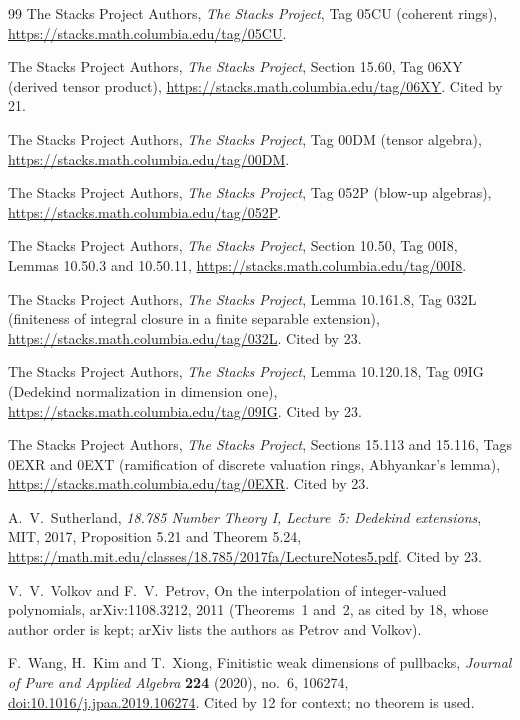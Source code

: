 \documentclass[11pt,letterpaper]{article}
\numberwithin{equation}{section}
\theoremstyle{definition}
\theoremstyle{remark}
\theoremstyle{plain}
\begin{document}
\begin{thebibliography}{99}
The Stacks Project Authors, \emph{The Stacks Project}, Tag 05CU (coherent rings),
\url{https://stacks.math.columbia.edu/tag/05CU}.

The Stacks Project Authors, \emph{The Stacks Project}, Section 15.60, Tag 06XY (derived tensor product),
\url{https://stacks.math.columbia.edu/tag/06XY}. Cited by 21.

The Stacks Project Authors, \emph{The Stacks Project}, Tag 00DM (tensor algebra),
\url{https://stacks.math.columbia.edu/tag/00DM}.

The Stacks Project Authors, \emph{The Stacks Project}, Tag 052P (blow-up algebras),
\url{https://stacks.math.columbia.edu/tag/052P}.

The Stacks Project Authors, \emph{The Stacks Project}, Section 10.50, Tag 00I8, Lemmas 10.50.3 and
10.50.11, \url{https://stacks.math.columbia.edu/tag/00I8}.

The Stacks Project Authors, \emph{The Stacks Project}, Lemma 10.161.8, Tag 032L (finiteness of integral closure in a finite separable extension),
\url{https://stacks.math.columbia.edu/tag/032L}. Cited by 23.

The Stacks Project Authors, \emph{The Stacks Project}, Lemma 10.120.18, Tag 09IG (Dedekind normalization in dimension one),
\url{https://stacks.math.columbia.edu/tag/09IG}. Cited by 23.

The Stacks Project Authors, \emph{The Stacks Project}, Sections 15.113 and 15.116, Tags 0EXR and 0EXT (ramification of discrete valuation rings,
Abhyankar's lemma), \url{https://stacks.math.columbia.edu/tag/0EXR}. Cited by 23.

A.~V.~Sutherland, \emph{18.785 Number Theory I, Lecture~5: Dedekind extensions}, MIT, 2017, Proposition 5.21 and Theorem 5.24,
\url{https://math.mit.edu/classes/18.785/2017fa/LectureNotes5.pdf}. Cited by 23.

V.~V.~Volkov and F.~V.~Petrov, On the interpolation of integer-valued polynomials, arXiv:1108.3212, 2011 (Theorems~1 and~2, as
cited by 18, whose author order is kept; arXiv lists the authors as Petrov and Volkov).

F.~Wang, H.~Kim and T.~Xiong, Finitistic weak dimensions of pullbacks, \emph{Journal of Pure and Applied
Algebra} \textbf{224} (2020), no.~6, 106274,
\href{https://doi.org/10.1016/j.jpaa.2019.106274}{doi:10.1016/j.jpaa.2019.106274}. Cited by 12 for context;
no theorem is used.


\end{thebibliography}
\end{document}
